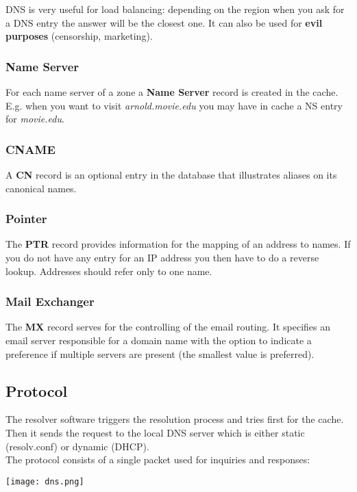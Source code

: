 \begin{observation}
	DNS is very useful for load balancing: depending on the region when you ask for a DNS entry the answer will be the closest one. It can also be used for \textbf{evil purposes} (censorship, marketing).
\end{observation}

\subsubsection{Name Server}
For each name server of a zone a \textbf{Name Server} record is created in the cache. E.g. when you want to visit \textit{arnold.movie.edu} you may have in cache a NS entry for \textit{movie.edu}.

\subsubsection{CNAME}
A \textbf{CN} record is an optional entry in the database that illustrates aliases on its canonical names. 

\subsubsection{Pointer}
The \textbf{PTR} record provides information for the mapping of an address to names. If you do not have any entry for an IP address you then have to do a reverse lookup. Addresses should refer only to one name.

\subsubsection{Mail Exchanger}
The \textbf{MX} record serves for the controlling of the email routing. It specifies an email server responsible for a domain name with the option to indicate a preference if multiple servers are present (the smallest value is preferred).

\subsection{Protocol}
The resolver software triggers the resolution process and tries first for the cache. Then it sends the request to the local DNS server which is either static (resolv.conf) or dynamic (DHCP). \\
The protocol consists of a single packet used for inquiries and responses:
\begin{center}
	\texttt{[image: dns.png]}
\end{center}
